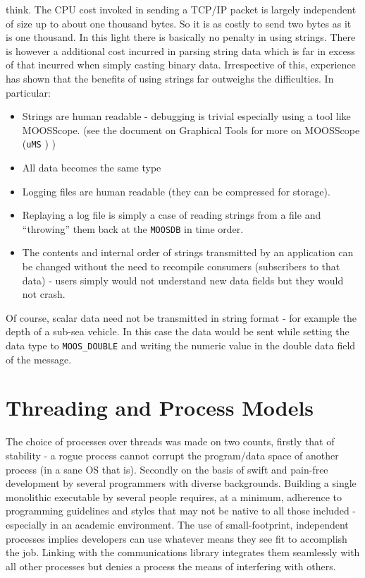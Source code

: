 \documentclass[a4paper,10pt]{article}
\newcommand{\Code}[1]{\texttt{#1} }
\newcommand{\code}[1]{\Code{#1} }
\newcommand{\DB}   {\code{{MOOSDB}}}
\begin{document}
think. The CPU cost invoked in sending a TCP/IP packet is largely
independent of size up to about one thousand bytes. So it is as
costly to send two bytes as it is one thousand. In this light
there is basically no penalty in using strings. There is however a
additional cost incurred in parsing string data which is far in
excess of that incurred when simply casting binary data.
Irrespective of this, experience has shown that the benefits of
using strings far outweighs the difficulties. In particular:
\begin{itemize}
\item Strings are human readable - debugging is trivial especially
using a tool like MOOSScope. (see the document on Graphical Tools for more on MOOSScope (\code{uMS}) )
\item All data becomes the same type
\item Logging files are human readable (they can be compressed for
storage).
\item Replaying a log file is simply a case of reading strings from
a file and ``throwing'' them back at the \DB in time order.
\item The contents and internal order of strings transmitted by an application can be changed
without the need to recompile consumers (subscribers to that data)
- users simply would not understand new data fields but they would
not crash.
\end{itemize}
Of course, scalar data need not be transmitted in string format -
for example the depth of a sub-sea vehicle. In this case the data
would be sent while setting the data type to  \verb"MOOS_DOUBLE"
and writing the numeric value in the double data field of the
message.

\section{Threading and Process Models}
The choice of processes over threads was made on two counts,
firstly that of stability - a rogue process cannot corrupt the
program/data space of another process (in a sane OS that is).
Secondly on the basis of swift and pain-free development by
several programmers with diverse backgrounds. Building a single
monolithic executable by several people requires, at a minimum,
adherence to programming guidelines and styles that may not be
native to all those included - especially in an academic
environment. The use of small-footprint, independent processes
implies developers can use whatever means they see fit to
accomplish the job. Linking with the communications library
integrates them seamlessly with all other processes but denies a
process the means of interfering with others.
\end{document}
